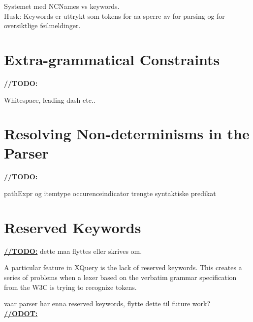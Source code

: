 Systemet med NCNames vs keywords. \\
Husk: Keywords er uttrykt som tokens for aa sperre av for parsing og for oversiktlige feilmeldinger.

\section{Extra-grammatical Constraints}

\textbf{\LARGE //TODO:} 

Whitespace, leading dash etc..

\section{Resolving Non-determinisms in the Parser }

\textbf{\LARGE //TODO:} 

pathExpr og itemtype occurenceindicator trengte syntaktiske predikat

\section{Reserved Keywords}

\underline{\textbf{\LARGE //TODO:}} dette maa flyttes eller skrives om.

A particular feature in XQuery is the lack of reserved keywords. This creates a
series of problems when a lexer based on the verbatim grammar specification from
the W3C is trying to recognize tokens. 

vaar parser har enna reserved keywords, flytte dette til future work? \\
\underline{\textbf{\LARGE //ODOT:}} 



